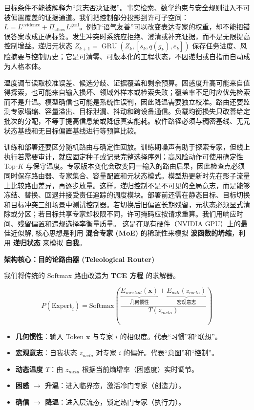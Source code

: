 目标条件不能被解释为“意志否决证据”。事实检索、数学约束与安全规则进入不可被偏置覆盖的证据通道。我们把控制部分投影到许可子空间：$L=L^{\mathrm{evidence}}+\Pi_{\mathrm{allow}}L^{\mathrm{goal}}$。例如“语气友善”可以改变表达专家的权重，却不能把错误答案改成正确标签。发生冲突时系统应拒绝、澄清或补充证据，而不是无限提高控制增益。递归元状态 $Z_{k+1}=\operatorname{GRU}(Z_k,[s_k,q(g_k),e_k])$ 保存任务进度、风险摘要与控制历史；它是可清零、可版本化的工程状态，不因递归或自指而自动成为人格本体。

温度调节读取校准误差、候选分歧、证据覆盖和剩余预算。困惑度升高可能来自值得探索，也可能来自输入损坏、领域外样本或检索失败；覆盖率不足时应优先检索而不是升温。模型确信也可能是系统性误判，因此降温需要独立校准。路由还要监测专家塌缩、容量溢出、目标泄漏、抖动和跨设备通信。负载均衡损失只改善给定批次的分配，不等于提高信息熵或降低真实能耗。软件路径必须与稠密基线、无元状态基线和无目标偏置基线进行等预算比较。

训练和部署还要区分随机路由与确定性回放。训练期噪声有助于探索专家，但线上执行若需要审计，就应固定种子或记录完整选择序列；高风险动作可使用确定性 Top-$K$ 与保守温度。专家版本变化会改变同一输入的路由后果，因此检查点必须同时保存路由器、专家集合、容量配置和元状态模式。模型热更新时先在影子流量上比较路由差异，再逐步放量。这样，递归控制不是不可见的全局意志，而是能够冻结、替换、回退并接受责任追踪的调度模块。部署前还需在静态目标、目标切换和目标冲突三组场景中测试控制器。若切换后旧偏置长期残留，元状态必须显式清除或分区；若目标共享专家却权限不同，许可掩码应按请求重算。我们用响应时间、残留偏置和违规选择率衡量质量。
这是在现有硬件（NVIDIA GPU）上的最佳近似解, 核心思想是利用 \textbf{混合专家 (MoE)} 的稀疏性来模拟 \textbf{波函数的坍缩}，利用 \textbf{递归状态} 来模拟 \textbf{自我}。



\textbf{架构核心：目的论路由器 (Teleological Router)}

我们将传统的 Softmax 路由改造为 \textbf{TCE 方程} 的求解器。

$$ P(\text{Expert}_i) = \text{Softmax}\left( \frac{\underbrace{E_{inertial}(\mathbf{x})}_{\text{几何惯性}} + \underbrace{E_{will}(z_{meta})}_{\text{宏观意志}}}{T(z_{meta})} \right) $$

\begin{itemize}
    \item   \textbf{几何惯性}：输入 Token $\mathbf{x}$ 与专家 $i$ 的相似度。代表“习惯”和“联想”。
    \item   \textbf{宏观意志}：自我状态 $z_{meta}$ 对专家 $i$ 的偏好。代表“意图”和“控制”。
    \item   \textbf{动态温度 $T$}：由 $z_{meta}$ 根据当前熵增率（困惑度）实时调节。
    \item   \textbf{困惑 $\to$ 升温}：进入临界态，激活冷门专家（创造力）。
    \item   \textbf{确信 $\to$ 降温}：进入层流态，锁定热门专家（执行力）。
\end{itemize}



